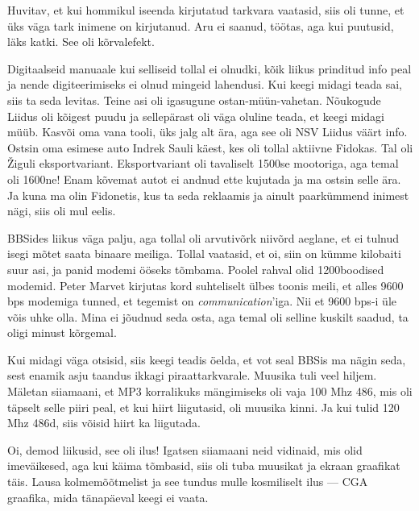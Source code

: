 Huvitav, et kui hommikul iseenda kirjutatud 
tarkvara vaatasid, siis oli tunne, et üks väga tark inimene on kirjutanud. Aru ei 
saanud, töötas, aga kui puutusid, läks katki. See oli kõrvalefekt. 


Digitaalseid manuaale kui selliseid tollal ei olnudki, kõik liikus prinditud info peal 
ja nende digiteerimiseks ei olnud mingeid lahendusi. Kui keegi midagi teada sai, siis ta seda levitas. Teine asi oli igasugune 
ostan-müün-vahetan. Nõukogude Liidus oli kõigest puudu ja sellepärast oli väga oluline 
teada, et keegi midagi müüb. Kasvõi oma vana tooli, üks jalg 
alt ära, aga see oli NSV Liidus väärt info. Ostsin oma 
esimese auto Indrek Sauli käest, kes oli tollal 
aktiivne Fidokas. Tal oli Žiguli eksportvariant. Eksportvariant oli tavaliselt 
1500se mootoriga, aga temal oli 1600ne! Enam kõvemat autot ei andnud 
ette kujutada ja ma ostsin selle ära. Ja kuna ma olin Fidonetis, kus ta seda reklaamis 
ja ainult paarkümmend inimest nägi, siis oli mul eelis.


BBSides liikus väga palju, aga tollal oli arvutivõrk niivõrd aeglane, et ei
tulnud isegi mõtet saata binaare meiliga. Tollal vaatasid, et 
oi, siin on kümme kilobaiti suur asi, ja panid modemi ööseks tõmbama. 
Poolel rahval olid 1200boodised 
modemid. Peter Marvet kirjutas kord suhteliselt ülbes 
toonis meili, et alles 9600 bps modemiga tunned, et tegemist on 
\emph{communication}'iga. Nii et 9600 bps-i üle võis uhke 
olla. Mina ei jõudnud seda osta, aga temal oli selline kuskilt 
saadud, ta oligi minust kõrgemal. 

Kui midagi väga otsisid, siis keegi teadis öelda, et 
vot seal BBSis ma nägin seda, sest enamik asju taandus ikkagi 
piraattarkvarale. Muusika tuli veel hiljem. Mäletan siiamaani, 
et MP3 korralikuks mängimiseks oli vaja 100 Mhz 486, mis oli täpselt selle 
piiri peal, et kui hiirt liigutasid, oli muusika kinni. Ja kui tulid 120 Mhz 
486d, siis võisid hiirt ka liigutada.


Oi, demod liikusid, see oli ilus! Igatsen siiamaani neid vidinaid, mis olid 
imeväikesed, aga kui käima tõmbasid, siis oli tuba muusikat ja ekraan 
graafikat täis. Lausa kolmemõõtmelist ja see tundus mulle 
kosmiliselt ilus --- CGA graafika, mida 
tänapäeval keegi ei vaata. 

